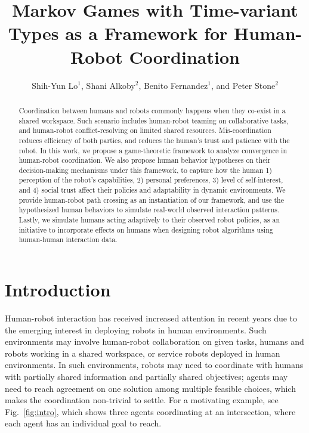 \documentclass[letterpaper, 10 pt, conference]{ieeeconf}  %
\title{\LARGE \bf
Markov Games with Time-variant Types as a Framework for Human-Robot Coordination
}
\author{Shih-Yun Lo$^{1}$, Shani Alkoby$^{2}$, Benito Fernandez$^{1}$, and Peter Stone$^{2}$%
}
\begin{document}
\maketitle
\thispagestyle{empty}
\pagestyle{empty}
\begin{abstract}
  Coordination between humans and robots commonly happens when they 
  co-exist in a shared workspace. Such scenario includes human-robot teaming on 
  collaborative tasks, and 
  human-robot conflict-resolving on limited shared resources. Mis-coordination 
  reduces 
  efficiency of both parties, and reduces the human's trust and patience with 
  the robot. In this work, we propose a game-theoretic framework to analyze 
  convergence in 
  human-robot coordination.
  We also propose human behavior hypotheses on their 
  decision-making mechanisms under this framework, 
  to capture how the human 1) perception of the robot's capabilities, 2) personal preferences, 3) level of self-interest, and 4) social 
  trust affect their policies and adaptability in dynamic environments. 
  We provide human-robot path crossing as an instantiation of our framework, and use the 
  hypothesized human behaviors to simulate real-world observed interaction 
  patterns. Lastly, we simulate humans acting adaptively to their observed robot 
  policies, as an initiative to incorporate effects on humans when designing 
  robot algorithms using human-human interaction data.
\end{abstract}
\vspace{-.2em}
\section{Introduction}
\vspace{-.2em}
Human-robot interaction has received increased attention in recent years due to the 
emerging interest in deploying robots in human environments. Such 
environments may involve human-robot collaboration on given tasks, 
humans and robots working in a shared workspace, or service 
robots deployed in human environments. In such environments, robots 
may need to coordinate with humans with partially shared information and 
partially shared objectives; agents may need to reach agreement on one 
solution among multiple feasible choices, which makes the coordination non-trivial to 
settle. For a motivating example, see Fig.~\ref{fig:intro}, which shows three agents coordinating at an 
intersection, where each agent has an individual goal to reach. 
\end{document}
